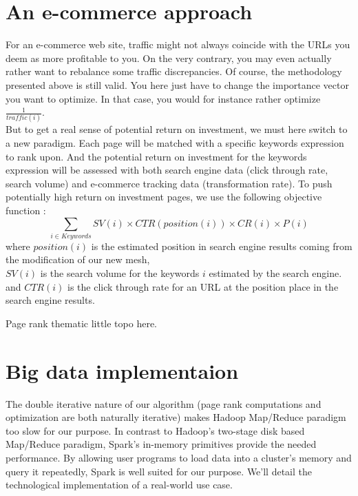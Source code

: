 \documentclass{iSWAGArticle}
\begin{document}
\section{An e-commerce approach}
For an e-commerce web site, traffic might not always coincide with the URLs you deem as more profitable to you.
On the very contrary, you may even actually rather want to rebalance some traffic discrepancies.
Of course, the methodology presented above is still valid. You here just have to change the importance vector you want to
optimize. In that case, you would for instance rather optimize $\frac{1}{traffic\left(i\right)}$.
\\\newline
But to get a real sense of potential return on investment, we must here switch to a new paradigm.
Each page will be matched with a specific keywords expression to rank upon. And the potential return on investment for the keywords expression will
be assessed with both search engine data (click through rate, search volume) and e-commerce tracking data (transformation rate).
To push potentially high return on investment pages, we use the following objective function :
\begin{equation}
 \sum_{i\in Keywords} SV\left( i\right)\times CTR\left(position\left(i\right)\right)\times CR\left(i\right)\times P\left(i\right)
\end{equation}
where $position\left(i\right)$ is the estimated position in search engine results coming from the modification of our new mesh,
\\\newline
$SV\left(i\right)$ is the search volume for the keywords $i$ estimated by the search engine.
\\\newline
and $CTR\left(i\right)$ is the click through rate for an URL at the position place in the search engine results.
\\\newline



Page rank thematic little topo here.


\section{Big data implementaion}
The double iterative nature of our algorithm (page rank computations and optimization are both naturally iterative)
makes Hadoop Map/Reduce paradigm too slow for our purpose. 
In contrast to Hadoop's two-stage disk based Map/Reduce paradigm, Spark's in-memory primitives provide the needed performance.
By allowing user programs to load data into a cluster's memory and query it repeatedly, Spark is well suited for our purpose.
We'll detail the technological implementation of a real-world use case.
\end{document}
